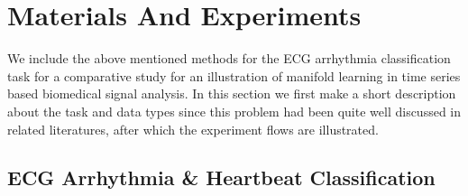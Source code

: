 \documentclass[journal]{IEEEtran}
\begin{document}
%
%


\section{Materials And Experiments}
We include the above mentioned methods for the ECG arrhythmia classification task for a comparative study for an illustration of manifold learning in time series based biomedical signal analysis.
In this section we first make a short description about the task and data types since this problem had been quite well discussed in related literatures, after which the experiment flows are illustrated.



%
%
\subsection{ECG Arrhythmia \& Heartbeat Classification}
\end{document}
